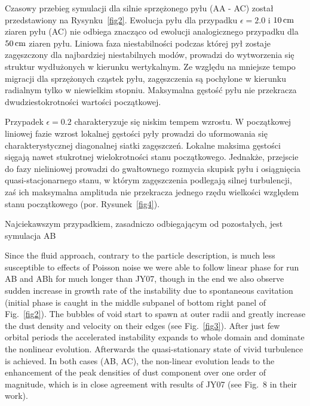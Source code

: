 Czasowy przebieg symulacji dla silnie sprzężonego pyłu (AA - AC) został
przedstawiony na Rysynku~\ref{fig2}. Ewolucja pyłu dla przypadku $\epsilon =
2.0$ i $10\hbox{$\thinspace\textrm{cm}$}$ ziaren pyłu (AC) nie odbiega znacząco od ewolucji analogicznego
przypadku dla $50\hbox{$\thinspace\textrm{cm}$}$ ziaren pyłu. Liniowa faza niestabilności podczas której
pył zostaje zagęszczony dla najbardziej niestabilnych modów, prowadzi do
wytworzenia się struktur wydłużonych w kierunku wertykalnym. Ze względu na
mniejsze tempo migracji dla sprzężonych cząstek pyłu, zagęszczenia są pochylone
w kierunku radialnym tylko w niewielkim stopniu. Maksymalna gęstość pyłu nie
przekracza dwudziestokrotności wartości początkowej.
\par Przypadek $\epsilon = 0.2$ charakteryzuje się niskim tempem wzrostu. W
początkowej liniowej fazie wzrost lokalnej gęstości pyły prowadzi do uformowania
się charakterystycznej diagonalnej siatki zagęszczeń. Lokalne maksima gęstości
sięgają nawet stukrotnej wielokrotności stanu początkowego. Jednakże, przejscie
do fazy nieliniowej prowadzi do gwałtownego rozmycia skupisk pyłu i osiągnięcia
quasi-stacjonarnego stanu, w którym zagęszczenia podlegają silnej turbulencji,
zaś ich maksymalna amplituda nie przekracza jednego rzędu wielkości względem
stanu początkowego (por. Rysunek~\ref{fig4}).

\par Najciekawszym przypadkiem, zasadniczo odbiegającym od pozostałych, jest
symulacja AB 

Since the fluid approach, contrary to the particle description, is much less
susceptible to effects of Poisson noise we were able to follow linear phase for
run AB and ABh for much longer than JY07, though in the end we also observe
sudden increase in growth rate of the instability due to spontaneous cavitation
(initial phase is caught in the middle subpanel of bottom right panel of
Fig.~\ref{fig2}).
The bubbles of void start to spawn at outer radii and greatly increase the dust
density and velocity on their edges (see Fig.~\ref{fig3}). After just
few orbital periods the accelerated instability expands to whole domain and
dominate the nonlinear evolution. Afterwards the quasi-stationary state of
vivid turbulence is achieved. 
In both cases (AB, AC), the non-linear evolution leads to the enhancement
of the peak densities of dust component over one order of magnitude, which is in
close agreement with results of JY07 (see Fig.~8 in their work).

